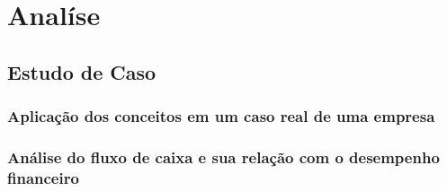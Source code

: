 \chapter{Anal\'ise}\label{chp:analysis}

\noindent
\hspace{0.635cm}

\section{Estudo de Caso}

\subsection{Aplicação dos conceitos em um caso real de uma empresa}
\subsection{Análise do fluxo de caixa e sua relação com o desempenho financeiro}
